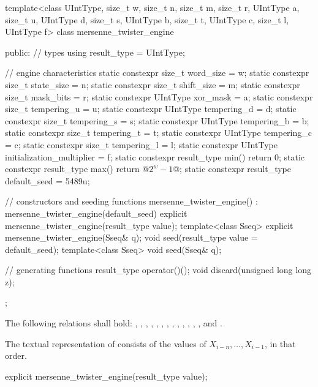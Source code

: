 %
\begin{codeblock}
template<class UIntType, size_t w, size_t n, size_t m, size_t r,
         UIntType a, size_t u, UIntType d, size_t s,
         UIntType b, size_t t,
         UIntType c, size_t l, UIntType f>
  class mersenne_twister_engine {
  public:
    // types
    using result_type = UIntType;

    // engine characteristics
    static constexpr size_t word_size = w;
    static constexpr size_t state_size = n;
    static constexpr size_t shift_size = m;
    static constexpr size_t mask_bits = r;
    static constexpr UIntType xor_mask = a;
    static constexpr size_t tempering_u = u;
    static constexpr UIntType tempering_d = d;
    static constexpr size_t tempering_s = s;
    static constexpr UIntType tempering_b = b;
    static constexpr size_t tempering_t = t;
    static constexpr UIntType tempering_c = c;
    static constexpr size_t tempering_l = l;
    static constexpr UIntType initialization_multiplier = f;
    static constexpr result_type min() { return 0; }
    static constexpr result_type max() { return  @$2^w - 1$@; }
    static constexpr result_type default_seed = 5489u;

    // constructors and seeding functions
    mersenne_twister_engine() : mersenne_twister_engine(default_seed) {}
    explicit mersenne_twister_engine(result_type value);
    template<class Sseq> explicit mersenne_twister_engine(Sseq& q);
    void seed(result_type value = default_seed);
    template<class Sseq> void seed(Sseq& q);

    // generating functions
    result_type operator()();
    void discard(unsigned long long z);
  };
\end{codeblock}

\pnum
The following relations shall hold:
  ,
  ,
  ,
  ,
  ,
  ,
  ,
  ,
  ,
  ,
  ,
  ,
  ,
and
  .

\pnum
The textual representation%
of 
consists of the values of $X_{i - n}, \dotsc, X_{i - 1}$,
in that order.

%
\begin{itemdecl}
explicit mersenne_twister_engine(result_type value);
\end{itemdecl}

